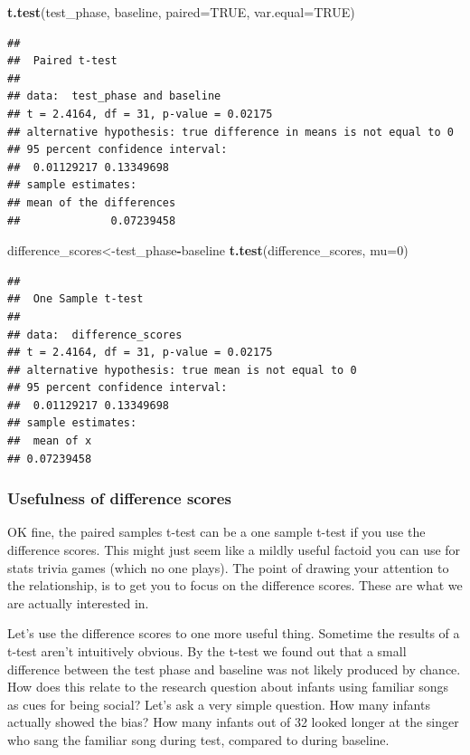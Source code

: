 \documentclass[]{book}
\newenvironment{Shaded}{\begin{snugshade}}{\end{snugshade}}
\newcommand{\KeywordTok}[1]{\textcolor[rgb]{0.13,0.29,0.53}{\textbf{#1}}}
\newcommand{\DataTypeTok}[1]{\textcolor[rgb]{0.13,0.29,0.53}{#1}}
\newcommand{\DecValTok}[1]{\textcolor[rgb]{0.00,0.00,0.81}{#1}}
\newcommand{\OtherTok}[1]{\textcolor[rgb]{0.56,0.35,0.01}{#1}}
\newcommand{\OperatorTok}[1]{\textcolor[rgb]{0.81,0.36,0.00}{\textbf{#1}}}
\newcommand{\NormalTok}[1]{#1}
\begin{document}
\begin{Shaded}
\begin{Highlighting}[]
\KeywordTok{t.test}\NormalTok{(test_phase, baseline, }\DataTypeTok{paired=}\OtherTok{TRUE}\NormalTok{, }\DataTypeTok{var.equal=}\OtherTok{TRUE}\NormalTok{)}
\end{Highlighting}
\end{Shaded}

\begin{verbatim}
## 
##  Paired t-test
## 
## data:  test_phase and baseline
## t = 2.4164, df = 31, p-value = 0.02175
## alternative hypothesis: true difference in means is not equal to 0
## 95 percent confidence interval:
##  0.01129217 0.13349698
## sample estimates:
## mean of the differences 
##              0.07239458
\end{verbatim}

\begin{Shaded}
\begin{Highlighting}[]
\NormalTok{difference_scores<-test_phase}\OperatorTok{-}\NormalTok{baseline}
\KeywordTok{t.test}\NormalTok{(difference_scores, }\DataTypeTok{mu=}\DecValTok{0}\NormalTok{)}
\end{Highlighting}
\end{Shaded}

\begin{verbatim}
## 
##  One Sample t-test
## 
## data:  difference_scores
## t = 2.4164, df = 31, p-value = 0.02175
## alternative hypothesis: true mean is not equal to 0
## 95 percent confidence interval:
##  0.01129217 0.13349698
## sample estimates:
##  mean of x 
## 0.07239458
\end{verbatim}

\subsubsection{Usefulness of difference
scores}\label{usefulness-of-difference-scores}

OK fine, the paired samples t-test can be a one sample t-test if you use
the difference scores. This might just seem like a mildly useful factoid
you can use for stats trivia games (which no one plays). The point of
drawing your attention to the relationship, is to get you to focus on
the difference scores. These are what we are actually interested in.

Let's use the difference scores to one more useful thing. Sometime the
results of a t-test aren't intuitively obvious. By the t-test we found
out that a small difference between the test phase and baseline was not
likely produced by chance. How does this relate to the research question
about infants using familiar songs as cues for being social? Let's ask a
very simple question. How many infants actually showed the bias? How
many infants out of 32 looked longer at the singer who sang the familiar
song during test, compared to during baseline.
\end{document}
